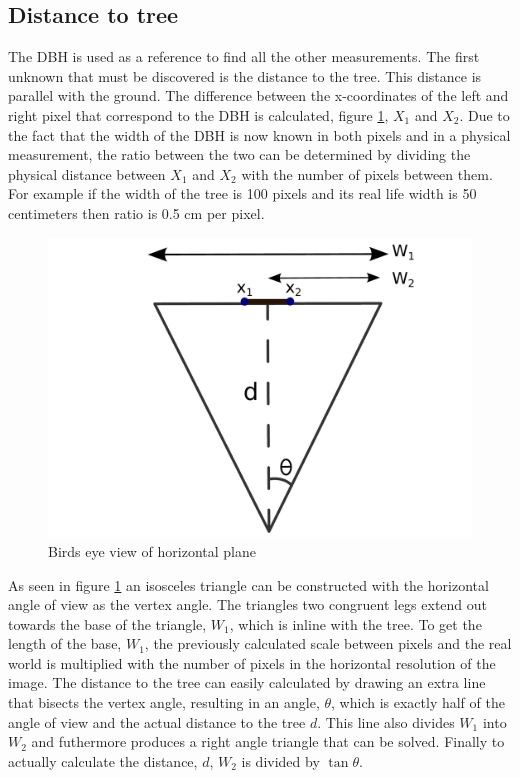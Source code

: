 \subsection{Distance to tree}
The DBH is used as a reference to find all the other measurements. The first unknown that must be discovered is the distance to the tree. This distance is parallel with the ground. The difference between the x-coordinates of the left and right pixel that correspond to the DBH is calculated, figure \ref{horizontal_triangle}, $X_1$ and $X_2$. Due to the fact that the width of the DBH is now known in both pixels and in a physical measurement, the ratio between the two can be determined by dividing the physical distance between $X_1$ and $X_2$ with the number of pixels between them. For example if the width of the tree is 100 pixels and its real life width is 50 centimeters then ratio is 0.5 cm per pixel.
\begin{figure}[htp]
\centering
{
	\includegraphics[scale=0.3]{horizontal_triangle.pdf}
	\caption{Birds eye view of horizontal plane}
	\label{horizontal_triangle}
}
\end{figure}
 As seen in figure \ref{horizontal_triangle} an isosceles triangle can be constructed with the horizontal angle of view as the vertex angle. The triangles two congruent legs extend out towards the base of the triangle, $W_1$, which is inline with the tree. To get the length of the base, $W_1$, the previously calculated scale between pixels and the real world is multiplied with the number of pixels in the horizontal resolution of the image. The distance to the tree can easily calculated by drawing an extra line that bisects the vertex angle, resulting in an angle, $\theta$, which is exactly half of the angle of view and the actual distance to the tree $d$. This line also divides $W_1$ into $W_2$ and futhermore produces a right angle triangle that can be solved. Finally to actually calculate the distance, $d$, $W_2$ is divided by $\tan{\theta}$.


